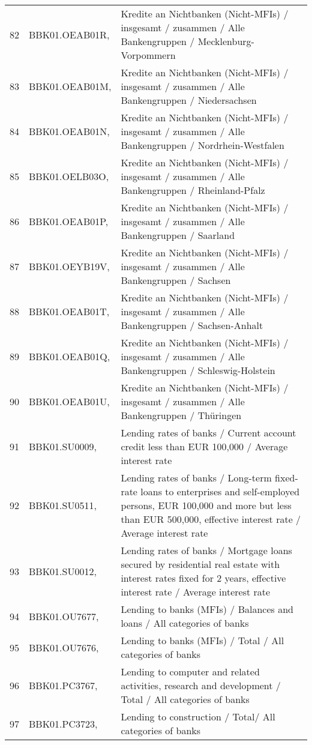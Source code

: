 \begin{table}[ht]
\begin{tabular}{rll}
  82 & BBK01.OEAB01R, & Kredite an Nichtbanken (Nicht-MFIs) / insgesamt / zusammen / Alle Bankengruppen / Mecklenburg-Vorpommern \\ 
  83 & BBK01.OEAB01M, & Kredite an Nichtbanken (Nicht-MFIs) / insgesamt / zusammen / Alle Bankengruppen / Niedersachsen \\ 
  84 & BBK01.OEAB01N, & Kredite an Nichtbanken (Nicht-MFIs) / insgesamt / zusammen / Alle Bankengruppen / Nordrhein-Westfalen \\ 
  85 & BBK01.OELB03O, & Kredite an Nichtbanken (Nicht-MFIs) / insgesamt / zusammen / Alle Bankengruppen / Rheinland-Pfalz \\ 
  86 & BBK01.OEAB01P, & Kredite an Nichtbanken (Nicht-MFIs) / insgesamt / zusammen / Alle Bankengruppen / Saarland \\ 
  87 & BBK01.OEYB19V, & Kredite an Nichtbanken (Nicht-MFIs) / insgesamt / zusammen / Alle Bankengruppen / Sachsen \\ 
  88 & BBK01.OEAB01T, & Kredite an Nichtbanken (Nicht-MFIs) / insgesamt / zusammen / Alle Bankengruppen / Sachsen-Anhalt \\ 
  89 & BBK01.OEAB01Q, & Kredite an Nichtbanken (Nicht-MFIs) / insgesamt / zusammen / Alle Bankengruppen / Schleswig-Holstein \\ 
  90 & BBK01.OEAB01U, & Kredite an Nichtbanken (Nicht-MFIs) / insgesamt / zusammen / Alle Bankengruppen / Thüringen \\ 
  91 & BBK01.SU0009, & Lending rates of banks / Current account credit less than EUR 100,000 / Average interest rate \\ 
  92 & BBK01.SU0511, & Lending rates of banks / Long-term fixed-rate loans to enterprises and self-employed persons, EUR 100,000 and more but less than EUR 500,000, effective interest rate / Average interest rate \\ 
  93 & BBK01.SU0012, & Lending rates of banks / Mortgage loans secured by residential real estate with interest rates fixed for 2 years, effective interest rate / Average interest rate \\ 
  94 & BBK01.OU7677, & Lending to banks (MFIs) / Balances and loans / All categories of banks \\ 
  95 & BBK01.OU7676, & Lending to banks (MFIs) / Total / All categories of banks \\ 
  96 & BBK01.PC3767, & Lending to computer and related activities, research and development / Total / All categories of banks \\ 
  97 & BBK01.PC3723, & Lending to construction / Total/ All categories of banks \\ 

\end{tabular}
\end{table}
